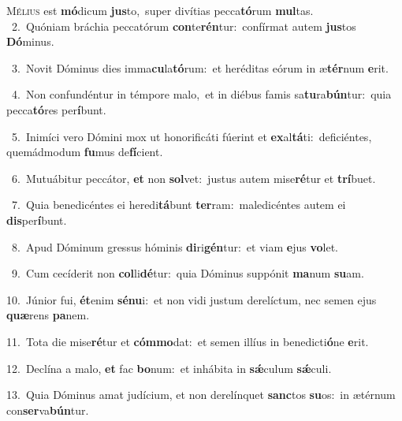 \lettrine{\initial\textcolor{\initialcolor}{M}}{élius} est \textbf{mó}\-dicum \textbf{jus}\-to,~\star super divítias pecca\-\textbf{tó}\-rum \textbf{mul}\-tas.\\
{\numbfont\textcolor{\numbcolor}{~2.}}~Quóniam bráchia peccatórum \textbf{con}\-te\-\textbf{rén}\-tur:~\star confírmat autem \textbf{jus}\-tos \textbf{Dó}\-minus.\par
{\numbfont\textcolor{\numbcolor}{~3.}}~Novit Dóminus dies imma\-\textbf{cu}\-la\-\textbf{tó}\-rum:~\star et heréditas eórum in æ\-\textbf{tér}\-num \textbf{e}\-rit.\par
{\numbfont\textcolor{\numbcolor}{~4.}}~Non confundéntur in témpore malo,~\dagger et in diébus famis sa\-\textbf{tu}\-ra\-\textbf{bún}\-tur:~\star quia pecca\-\textbf{tó}\-res per\-\textbf{í}\-bunt.\par
{\numbfont\textcolor{\numbcolor}{~5.}}~Inimíci vero Dómini mox ut honorificáti fúerint et \textbf{ex}\-al\-\textbf{tá}\-ti:~\star deficiéntes, quemádmodum \textbf{fu}\-mus de\-\textbf{fí}\-cient.\par
{\numbfont\textcolor{\numbcolor}{~6.}}~Mutuábitur peccátor, \textbf{et} non \textbf{sol}\-vet:~\star justus autem mise\-\textbf{ré}\-tur et \textbf{trí}\-buet.\par
{\numbfont\textcolor{\numbcolor}{~7.}}~Quia benedicéntes ei heredi\-\textbf{tá}\-bunt \textbf{ter}\-ram:~\star maledicéntes autem ei \textbf{dis}\-per\-\textbf{í}\-bunt.\par
{\numbfont\textcolor{\numbcolor}{~8.}}~Apud Dóminum gressus hóminis \textbf{di}\-ri\-\textbf{gén}\-tur:~\star et viam \textbf{e}\-jus \textbf{vo}\-let.\par
{\numbfont\textcolor{\numbcolor}{~9.}}~Cum cecíderit non \textbf{col}\-li\-\textbf{dé}\-tur:~\star quia Dóminus suppónit \textbf{ma}\-num \textbf{su}\-am.\par
{\numbfont\textcolor{\numbcolor}{10.}}~Júnior fui, \textbf{ét}\-enim \textbf{sé}\-\textbf{nu}i:~\star et non vidi justum derelíctum, nec semen ejus \textbf{quæ}\-rens \textbf{pa}\-nem.\par
{\numbfont\textcolor{\numbcolor}{11.}}~Tota die mise\-\textbf{ré}\-tur et \textbf{cóm}\-\textbf{mo}dat:~\star et semen illíus in benedicti\-\textbf{ó}\-ne \textbf{e}\-rit.\par
{\numbfont\textcolor{\numbcolor}{12.}}~Declína a malo, \textbf{et} fac \textbf{bo}\-num:~\star et inhábita in \textbf{sǽ}\-culum \textbf{sǽ}\-culi.\par
{\numbfont\textcolor{\numbcolor}{13.}}~Quia Dóminus amat judícium, et non derelínquet \textbf{sanc}\-tos \textbf{su}\-os:~\star in ætérnum con\-\textbf{ser}\-va\-\textbf{bún}\-tur.\par
